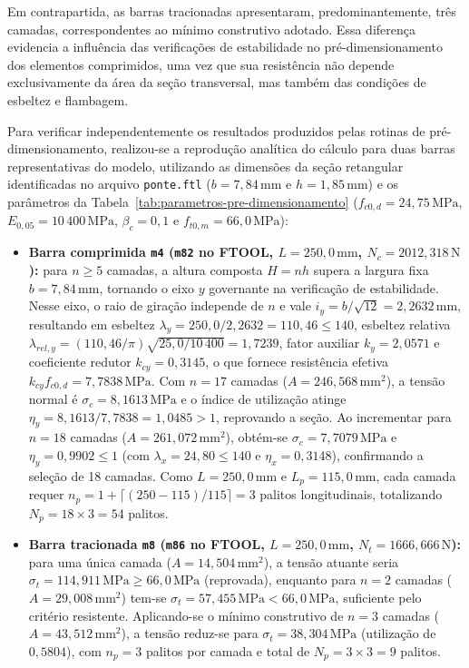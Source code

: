 Em contrapartida, as barras tracionadas apresentaram, predominantemente, três camadas, correspondentes ao mínimo construtivo adotado. Essa diferença evidencia a influência das verificações de estabilidade no pré-dimensionamento dos elementos comprimidos, uma vez que sua resistência não depende exclusivamente da área da seção transversal, mas também das condições de esbeltez e flambagem.

Para verificar independentemente os resultados produzidos pelas rotinas de pré-dimensionamento, realizou-se a reprodução analítica do cálculo para duas barras representativas do modelo, utilizando as dimensões da seção retangular identificadas no arquivo \texttt{ponte.ftl} (\(b = 7,84\,\mathrm{mm}\) e \(h = 1,85\,\mathrm{mm}\)) e os parâmetros da Tabela~\ref{tab:parametros-pre-dimensionamento} (\(f_{c0,d} = 24,75\,\mathrm{MPa}\), \(E_{0,05} = 10\,400\,\mathrm{MPa}\), \(\beta_c = 0,1\) e \(f_{t0,m} = 66,0\,\mathrm{MPa}\)):

\begin{itemize}
    \item \textbf{Barra comprimida \texttt{m4} (\texttt{m82} no \acrshort{FTOOL}, \(L = 250,0\,\mathrm{mm}\), \(N_c = 2012,318\,\mathrm{N}\)):} para \(n \geq 5\) camadas, a altura composta \(H = nh\) supera a largura fixa \(b = 7,84\,\mathrm{mm}\), tornando o eixo \(y\) governante na verificação de estabilidade. Nesse eixo, o raio de giração independe de \(n\) e vale \(i_y = b/\sqrt{12} = 2,2632\,\mathrm{mm}\), resultando em esbeltez \(\lambda_y = 250,0/2,2632 = 110,46 \leq 140\), esbeltez relativa \(\lambda_{rel,y} = (110,46/\pi)\sqrt{25,0/10\,400} = 1,7239\), fator auxiliar \(k_y = 2,0571\) e coeficiente redutor \(k_{cy} = 0,3145\), o que fornece resistência efetiva \(k_{cy}f_{c0,d} = 7,7838\,\mathrm{MPa}\). Com \(n = 17\) camadas (\(A = 246,568\,\mathrm{mm}^2\)), a tensão normal é \(\sigma_c = 8,1613\,\mathrm{MPa}\) e o índice de utilização atinge \(\eta_y = 8,1613/7,7838 = 1,0485 > 1\), reprovando a seção. Ao incrementar para \(n = 18\) camadas (\(A = 261,072\,\mathrm{mm}^2\)), obtém-se \(\sigma_c = 7,7079\,\mathrm{MPa}\) e \(\eta_y = 0,9902 \leq 1\) (com \(\lambda_x = 24,80 \leq 140\) e \(\eta_x = 0,3148\)), confirmando a seleção de 18 camadas. Como \(L = 250,0\,\mathrm{mm}\) e \(L_p = 115,0\,\mathrm{mm}\), cada camada requer \(n_p = 1 + \lceil(250-115)/115\rceil = 3\) palitos longitudinais, totalizando \(N_p = 18 \times 3 = 54\) palitos.
    \item \textbf{Barra tracionada \texttt{m8} (\texttt{m86} no \acrshort{FTOOL}, \(L = 250,0\,\mathrm{mm}\), \(N_t = 1666,666\,\mathrm{N}\)):} para uma única camada (\(A = 14,504\,\mathrm{mm}^2\)), a tensão atuante seria \(\sigma_t = 114,911\,\mathrm{MPa} \geq 66,0\,\mathrm{MPa}\) (reprovada), enquanto para \(n = 2\) camadas (\(A = 29,008\,\mathrm{mm}^2\)) tem-se \(\sigma_t = 57,455\,\mathrm{MPa} < 66,0\,\mathrm{MPa}\), suficiente pelo critério resistente. Aplicando-se o mínimo construtivo de \(n = 3\) camadas (\(A = 43,512\,\mathrm{mm}^2\)), a tensão reduz-se para \(\sigma_t = 38,304\,\mathrm{MPa}\) (utilização de \(0,5804\)), com \(n_p = 3\) palitos por camada e total de \(N_p = 3 \times 3 = 9\) palitos.
\end{itemize}

